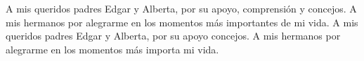 \begin{epigraph}
    \hfill {\fontsize{9}{13}\selectfont \hfill A mis queridos padres Edgar y Alberta, por  su apoyo, comprensión y concejos. A mis hermanos por alegrarme en los momentos más importantes de mi vida. A mis queridos padres Edgar y Alberta,  por  su apoyo concejos. A mis hermanos por alegrarme en los momentos más importa mi vida.} 
\end{epigraph}